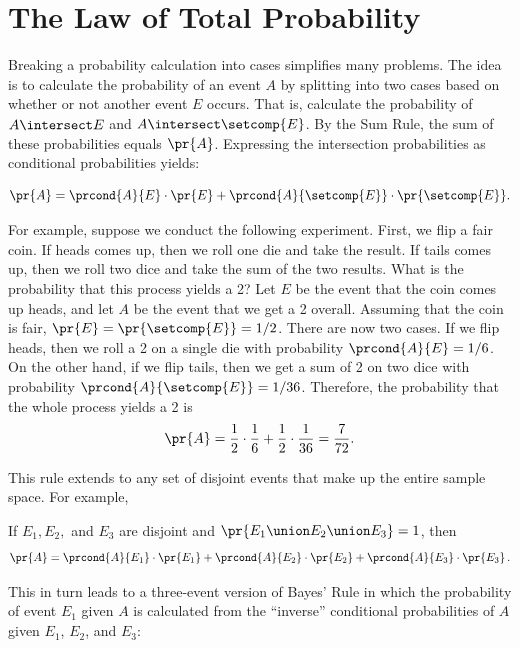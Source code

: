
\begin{problems}
\homeworkproblems
{}
\end{problems}

\section{The Law of Total Probability}\label{sec:total_probability}

Breaking a probability calculation into cases simplifies many
problems.  The idea is to calculate the probability of an event $A$ by
splitting into two cases based on whether or not another event $E$
occurs.  That is, calculate the probability of $A\nobreak
\intersect\nobreak E$ and $A \intersect \setcomp{E}$.  By the Sum
Rule, the sum of these probabilities equals $\pr{A}$.  Expressing the
intersection probabilities as conditional probabilities yields:
\begin{rul}\label{total_prob_Ebar}
\[
\pr{A} = \prcond{A}{E} \cdot \pr{E} +
         \prcond{A}{\setcomp{E}} \cdot \pr{\setcomp{E}}.
\]
\end{rul}

For example, suppose we conduct the following experiment.  First, we
flip a fair coin.  If heads comes up, then we roll one die and take the
result.  If tails comes up, then we roll two dice and take the sum of
the two results.  What is the probability that this process yields a
2?  Let $E$ be the event that the coin comes up heads, and let $A$ be
the event that we get a 2 overall.  Assuming that the coin is fair,
$\pr{E} = \pr{\setcomp{E}} = 1/2$.  There are now two cases. If we
flip heads, then we roll a 2 on a single die with probability
$\prcond{A}{E} = 1/6$.  On the other hand, if we flip tails, then we
get a sum of 2 on two dice with probability
$\prcond{A}{\setcomp{E}} = 1/36$.  Therefore, the probability that
the whole process yields a 2 is
\[
\pr{A} = \frac{1}{2} \cdot \frac{1}{6} + \frac{1}{2} \cdot \frac{1}{36} =
  \frac{7}{72}.
\]

This rule extends to any set of disjoint events that make up the
entire sample space.  For example,
\begin{rul*}
If $E_1, E_2,$ and $E_3$ are disjoint and
$\pr{E_1 \union E_2 \union E_3} = 1$, then
\[
\pr{A} = \prcond{A}{E_1} \cdot \pr{E_1} + \prcond{A}{E_2} \cdot
\pr{E_2} + \prcond{A}{E_3} \cdot \pr{E_3}\,.
\]
\end{rul*}
This in turn leads to a three-event version of Bayes' Rule in which
the probability of event $E_1$ given $A$ is calculated from the
``inverse'' conditional probabilities of $A$ given $E_1$, $E_2$, and
$E_3$:

